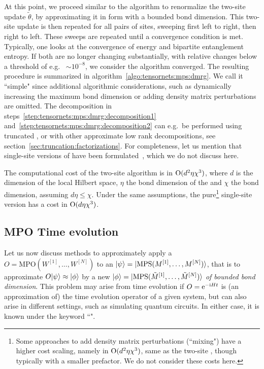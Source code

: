 At this point, we proceed similar to the  algorithm to renormalize the two-site update $\tilde\theta$, by approximating it in  form with a bounded bond dimension.
%
This two-site update is then repeated for all pairs of sites, sweeping first left to right, then right to left.
%
These sweeps are repeated until a convergence condition is met.
%
Typically, one looks at the convergence of energy and bipartite entanglement entropy.
%
If both are no longer changing substantially, with relative changes below a threshold of e.g.~ $\sim 10^{-8}$, we consider the algorithm converged.
%
The resulting procedure is summarized in algorithm~\ref{algo:tensornets:mps:dmrg}.
%
We call it ``simple" since additional algorithmic considerations, such as dynamically increasing the maximum bond dimension or adding density matrix perturbations~\cite{hubig2015} are omitted.
%
The decomposition in steps~\ref{step:tensornets:mps:dmrg:decomposition1} and~\ref{step:tensornets:mps:dmrg:decomposition2} can e.g.~be performed using truncated , or with other approximate low rank decompositions, see section~\ref{sec:truncation:factorizations}.
%
For completeness, let us mention that single-site versions of  have been formulated~\cite{white2005b}, which we do not discuss here.

The computational cost of the two-site algorithm is in $\mathrm{O}(d^2\eta\chi^3)$, where $d$ is the dimension of the local Hilbert space, $\eta$ the bond dimension of the  and $\chi$ the  bond dimension, assuming $d\eta \leq \chi$.
%
Under the same assumptions, the pure\footnote{
    Some approaches to add density matrix perturbations (``mixing") have a higher cost scaling, namely in $\mathrm{O}(d^2\eta\chi^3)$, same as the two-site , though typically with a smaller prefactor.
    We do not consider these costs here.
} single-site version has a cost in $\mathrm{O}(d\eta\chi^3)$.

\subsection{MPO Time evolution}
\label{subsec:mps:mpo_evolution}

Let us now discuss methods to approximately apply a  $O = \text{MPO}(W^{[1]}, \dots, W^{[N]})$ to an  $\ket{\psi} = \ket{\text{MPS}(M^{[1]}, \dots, M^{[N]})}$, that is to approximate $O \ket{\psi} \approx \ket{\phi}$ by a new  $\ket{\phi} = \ket{\text{MPS}(\tilde{M}^{[1]}, \dots, \tilde{M}^{[N]})}$ \emph{of bounded bond dimension}.
%
This problem may arise from time evolution if $O = \mathrm{e}^{-\mathrm{i} H t}$ is (an approximation of) the time evolution operator of a given system, but can also arise in different settings, such as simulating quantum circuits.
%
In either case, it is known under the keyword ``".

